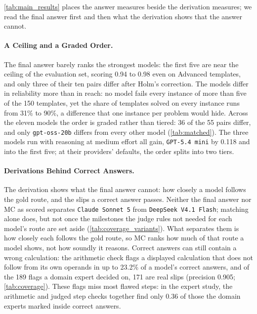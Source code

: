 \autoref{tab:main_results} places the answer measures beside the derivation measures; we read the
final answer first and then what the derivation shows that the answer cannot.

\paragraph{A Ceiling and a Graded Order.} The final answer barely ranks the strongest models: the
first five are near the ceiling of the evaluation set, scoring 0.94 to 0.98 even on Advanced
templates, and only three of their ten pairs differ after Holm's correction.
The models differ in reliability more than in reach: no model fails every instance of more than
five of the 150 templates, yet the share of templates solved on every instance runs from 31\% to
90\%, a difference that one instance per problem would hide.
Across the eleven models the order is graded rather than tiered: 36 of the 55 pairs differ, and
only \texttt{gpt-oss-20b} differs from every other model (\autoref{tab:matched}).
The three models run with reasoning at medium effort all gain, \texttt{GPT-5.4 mini} by 0.118 and
into the first five; at their providers' defaults, the order splits into two tiers.

\paragraph{Derivations Behind Correct Answers.} The derivation shows what the final answer cannot:
how closely a model follows the gold route, and the slips a correct answer passes.
Neither the final answer nor MC as scored separates \texttt{Claude Sonnet 5} from
\texttt{DeepSeek V4.1 Flash}; matching alone does, but not once the milestones the judge rules
not needed for each model's route are set aside (\autoref{tab:coverage_variants}).
What separates them is how closely each follows the gold route, so MC ranks how much of that route a
model shows, not how soundly it reasons.
Correct answers can still contain a wrong calculation: the arithmetic check flags a displayed
calculation that does not follow from its own operands in up to 23.2\% of a model's correct
answers, and of the 189 flags a domain expert decided on, 171 are real slips (precision 0.905;
\autoref{tab:coverage}).
These flags miss most flawed steps: in the expert study, the arithmetic and judged step checks
together find only 0.36 of those the domain experts marked inside correct answers.


